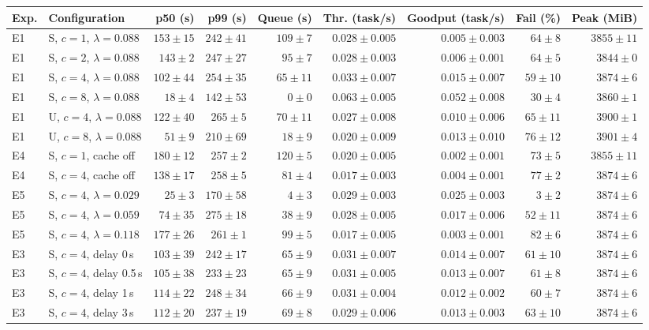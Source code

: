 \begin{tabular}{@{}llrrrrrrr@{}}
\toprule
Exp. & Configuration & p50 (s) & p99 (s) & Queue (s) & Thr. (task/s) & Goodput (task/s) & Fail (\%) & Peak (MiB) \\
\midrule
E1 & S, $c{=}1$, $\lambda{=}0.088$ & $153\pm15$ & $242\pm41$ & $109\pm7$ & $0.028\pm0.005$ & $0.005\pm0.003$ & $64\pm8$ & $3855\pm11$ \\
E1 & S, $c{=}2$, $\lambda{=}0.088$ & $143\pm2$ & $247\pm27$ & $95\pm7$ & $0.028\pm0.003$ & $0.006\pm0.001$ & $64\pm5$ & $3844\pm0$ \\
E1 & S, $c{=}4$, $\lambda{=}0.088$ & $102\pm44$ & $254\pm35$ & $65\pm11$ & $0.033\pm0.007$ & $0.015\pm0.007$ & $59\pm10$ & $3874\pm6$ \\
E1 & S, $c{=}8$, $\lambda{=}0.088$ & $18\pm4$ & $142\pm53$ & $0\pm0$ & $0.063\pm0.005$ & $0.052\pm0.008$ & $30\pm4$ & $3860\pm1$ \\
E1 & U, $c{=}4$, $\lambda{=}0.088$ & $122\pm40$ & $265\pm5$ & $70\pm11$ & $0.027\pm0.008$ & $0.010\pm0.006$ & $65\pm11$ & $3900\pm1$ \\
E1 & U, $c{=}8$, $\lambda{=}0.088$ & $51\pm9$ & $210\pm69$ & $18\pm9$ & $0.020\pm0.009$ & $0.013\pm0.010$ & $76\pm12$ & $3901\pm4$ \\
\addlinespace[2pt]
E4 & S, $c{=}1$, cache off & $180\pm12$ & $257\pm2$ & $120\pm5$ & $0.020\pm0.005$ & $0.002\pm0.001$ & $73\pm5$ & $3855\pm11$ \\
E4 & S, $c{=}4$, cache off & $138\pm17$ & $258\pm5$ & $81\pm4$ & $0.017\pm0.003$ & $0.004\pm0.001$ & $77\pm2$ & $3874\pm6$ \\
\addlinespace[2pt]
E5 & S, $c{=}4$, $\lambda{=}0.029$ & $25\pm3$ & $170\pm58$ & $4\pm3$ & $0.029\pm0.003$ & $0.025\pm0.003$ & $3\pm2$ & $3874\pm6$ \\
E5 & S, $c{=}4$, $\lambda{=}0.059$ & $74\pm35$ & $275\pm18$ & $38\pm9$ & $0.028\pm0.005$ & $0.017\pm0.006$ & $52\pm11$ & $3874\pm6$ \\
E5 & S, $c{=}4$, $\lambda{=}0.118$ & $177\pm26$ & $261\pm1$ & $99\pm5$ & $0.017\pm0.005$ & $0.003\pm0.001$ & $82\pm6$ & $3874\pm6$ \\
\addlinespace[2pt]
E3 & S, $c{=}4$, delay 0\,s & $103\pm39$ & $242\pm17$ & $65\pm9$ & $0.031\pm0.007$ & $0.014\pm0.007$ & $61\pm10$ & $3874\pm6$ \\
E3 & S, $c{=}4$, delay 0.5\,s & $105\pm38$ & $233\pm23$ & $65\pm9$ & $0.031\pm0.005$ & $0.013\pm0.007$ & $61\pm8$ & $3874\pm6$ \\
E3 & S, $c{=}4$, delay 1\,s & $114\pm22$ & $248\pm34$ & $66\pm9$ & $0.031\pm0.004$ & $0.012\pm0.002$ & $60\pm7$ & $3874\pm6$ \\
E3 & S, $c{=}4$, delay 3\,s & $112\pm20$ & $237\pm19$ & $69\pm8$ & $0.029\pm0.006$ & $0.013\pm0.003$ & $63\pm10$ & $3874\pm6$ \\
\bottomrule
\end{tabular}

